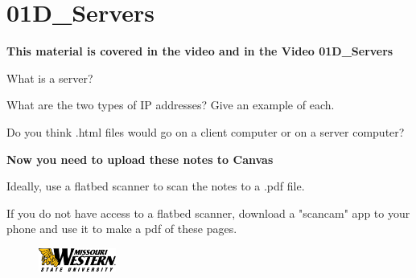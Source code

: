 \documentclass[letterpaper,12pt]{exam}
\begin{document}
\section*{01D\_Servers}
\begin{center}
	\textbf{This material is covered in the video and in the Video 01D\_Servers}
\end{center}
\begin{questions}
\question  What is a server?
\vspace{1.5cm}

\question What are the two types of IP addresses?  Give an example of each. 
\vspace{1.5cm}

\question Do you think .html files would go on a client computer or on a server computer? 
\vspace{1.5cm}

\end{questions}
\begin{center}
	\textbf{Now you need to upload these notes to Canvas}

	Ideally, use a flatbed scanner to scan the notes to a .pdf file.

	If you do not have access to a flatbed scanner, download a "scancam" app to your phone and use it to make a pdf of these pages.
\end{center}
\vspace{1cm}

\begin{figure}[b]\label{end}
	\center
	\includegraphics[width=1in]{tux}
\end{figure}
\end{document}
